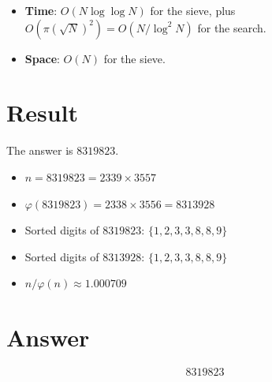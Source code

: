 \documentclass[12pt,a4paper]{article}
\begin{document}
\begin{itemize}
    \item \textbf{Time}: $O(N \log \log N)$ for the sieve, plus $O(\pi(\sqrt{N})^2) = O(N/\log^2 N)$ for the search.
    \item \textbf{Space}: $O(N)$ for the sieve.
\end{itemize}

\section{Result}

The answer is $\boxed{8319823}$.

\begin{itemize}
    \item $n = 8319823 = 2339 \times 3557$
    \item $\varphi(8319823) = 2338 \times 3556 = 8313928$
    \item Sorted digits of $8319823$: $\{1, 2, 3, 3, 8, 8, 9\}$
    \item Sorted digits of $8313928$: $\{1, 2, 3, 3, 8, 8, 9\}$ \checkmark
    \item $n / \varphi(n) \approx 1.000709$
\end{itemize}

\section{Answer}

\[
\boxed{8319823}
\]
\end{document}
